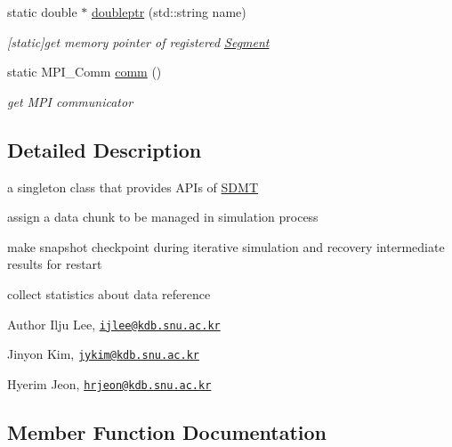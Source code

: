 \begin{DoxyCompactItemize}
static double $\ast$ \hyperlink{class_s_d_m_t_ab51288f0cabdd3a1ff1db6920c1096f7}{doubleptr} (std\+::string name)
\begin{DoxyCompactList}\small\item\em \mbox{[}static\mbox{]}get memory pointer of registered \hyperlink{struct_s_d_m_t_1_1_segment}{Segment} \end{DoxyCompactList}\item 
static M\+P\+I\+\_\+\+Comm \hyperlink{class_s_d_m_t_a92bb161da5bd3ffd846ba811fc27c161}{comm} ()
\begin{DoxyCompactList}\small\item\em get M\+PI communicator \end{DoxyCompactList}\end{DoxyCompactItemize}


\subsection{Detailed Description}
a singleton class that provides A\+P\+Is of \hyperlink{class_s_d_m_t}{S\+D\+MT} 

\begin{DoxyItemize}
\item assign a data chunk to be managed in simulation process\end{DoxyItemize}
\begin{DoxyItemize}
\item make snapshot checkpoint during iterative simulation and recovery intermediate results for restart\end{DoxyItemize}
\begin{DoxyItemize}
\item collect statistics about data reference\end{DoxyItemize}
\begin{DoxyAuthor}{Author}
Ilju Lee, \href{mailto:ijlee@kdb.snu.ac.kr}{\tt ijlee@kdb.\+snu.\+ac.\+kr} 

Jinyon Kim, \href{mailto:jykim@kdb.snu.ac.kr}{\tt jykim@kdb.\+snu.\+ac.\+kr} 

Hyerim Jeon, \href{mailto:hrjeon@kdb.snu.ac.kr}{\tt hrjeon@kdb.\+snu.\+ac.\+kr} 
\end{DoxyAuthor}


\subsection{Member Function Documentation}
\mbox{\label{class_s_d_m_t_ae6218bd71d632ae413bec2d588547fc8}} 
